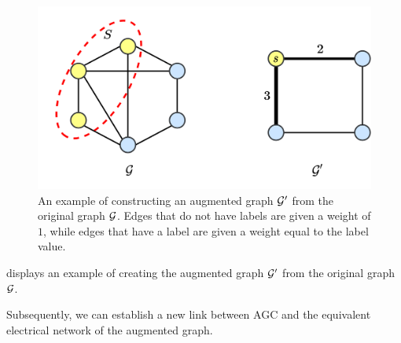 \documentclass[10pt,twocolumn,twoside]{IEEEtran}
\begin{document}
\begin{figure}[!t]
    \centering
    \includegraphics[width=0.9\linewidth]{augmented_graph.png}
    \caption{An example of constructing an augmented graph \(\mathcal{G}'\) from the original graph \(\mathcal{G}\). Edges that do not have labels are given a weight of \(1\), while edges that have a label are given a weight equal to the label value.}
    \label{fig:augmented-graph}
\end{figure}

 displays an example of creating the augmented graph \(\mathcal{G}'\) from the original graph \(\mathcal{G}\).

Subsequently, we can establish a new link between AGC and the equivalent electrical network of the augmented graph.
\end{document}
